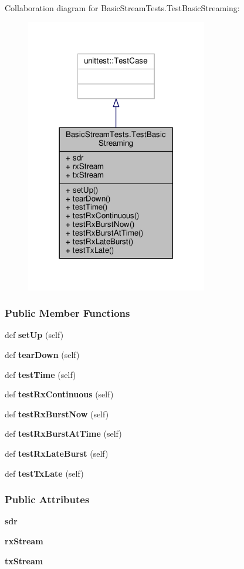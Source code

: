 Collaboration diagram for Basic\+Stream\+Tests.\+Test\+Basic\+Streaming\+:
\nopagebreak
\begin{figure}[H]
\begin{center}
\leavevmode
\includegraphics[width=225pt]{d9/dc5/classBasicStreamTests_1_1TestBasicStreaming__coll__graph}
\end{center}
\end{figure}
\subsubsection*{Public Member Functions}
\begin{DoxyCompactItemize}
\item 
def {\bf set\+Up} (self)
\item 
def {\bf tear\+Down} (self)
\item 
def {\bf test\+Time} (self)
\item 
def {\bf test\+Rx\+Continuous} (self)
\item 
def {\bf test\+Rx\+Burst\+Now} (self)
\item 
def {\bf test\+Rx\+Burst\+At\+Time} (self)
\item 
def {\bf test\+Rx\+Late\+Burst} (self)
\item 
def {\bf test\+Tx\+Late} (self)
\end{DoxyCompactItemize}
\subsubsection*{Public Attributes}
\begin{DoxyCompactItemize}
\item 
{\bf sdr}
\item 
{\bf rx\+Stream}
\item 
{\bf tx\+Stream}
\end{DoxyCompactItemize}


